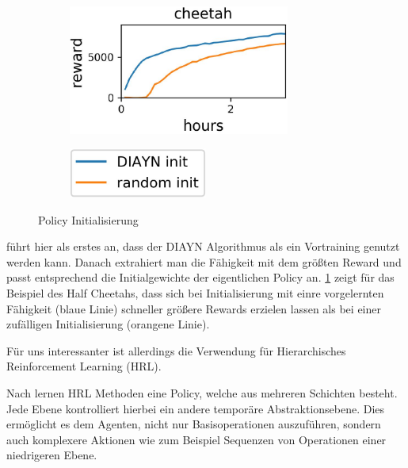 \smallspace

\begin{figure}[h]
\begin{subfigure}{0.6\textwidth}
\includegraphics[width=0.8\textwidth, keepaspectratio=true, right]{images/cheetah_rewards.JPG}
\end{subfigure}
\begin{subfigure}{0.4\textwidth}
\includegraphics[width=0.5\textwidth, keepaspectratio=true, left]{images/cheetah_rewards_exp.JPG}
\end{subfigure}
\caption{Policy Initialisierung} \label{img:cheetah_rewards}
\end{figure}

\cite{diversity_eysenbach} führt hier als erstes an, dass der DIAYN Algorithmus als ein Vortraining genutzt werden kann. Danach extrahiert man die Fähigkeit mit dem größten Reward und passt entsprechend die Initialgewichte der eigentlichen Policy an. \ref{img:cheetah_rewards} zeigt für das Beispiel des Half Cheetahs, dass sich bei Initialisierung mit einre vorgelernten Fähigkeit (blaue Linie) schneller größere Rewards erzielen lassen als bei einer zufälligen Initialisierung (orangene Linie).

\smallspace

Für uns interessanter ist allerdings die Verwendung für Hierarchisches Reinforcement Learning (HRL). 

Nach \cite{BerliacHierachialRL2019} lernen HRL Methoden eine Policy, welche aus mehreren Schichten besteht. Jede Ebene kontrolliert hierbei ein andere temporäre Abstraktionsebene. Dies ermöglicht es dem Agenten, nicht nur Basisoperationen auszuführen, sondern auch komplexere Aktionen wie zum Beispiel Sequenzen von Operationen einer niedrigeren Ebene.

